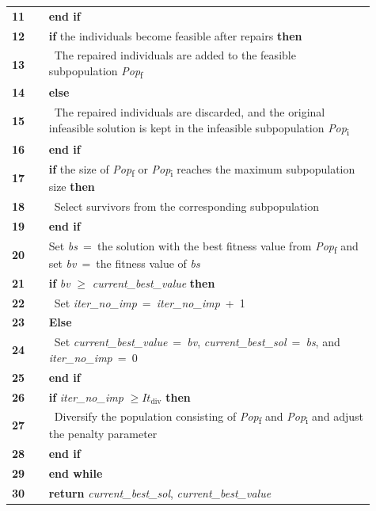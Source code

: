 \begin{longtable}{@{}L{0.055\linewidth}L{0.025\linewidth}L{0.83\linewidth}@{}}
\textbf{11} & & \textbf{end if} \\
\textbf{12} & & \textbf{if} the individuals become feasible after repairs \textbf{then} \\
\textbf{13} & & ~The repaired individuals are added to the feasible subpopulation
\emph{Pop}\textsubscript{f} \\
\textbf{14} & & \textbf{else} \\
\textbf{15} & & ~The repaired individuals are discarded, and the original infeasible solution is
kept in the infeasible subpopulation \emph{Pop}\textsubscript{i} \\
\textbf{16} & & \textbf{end if} \\
\textbf{17} & & \textbf{if} the size of \emph{Pop}\textsubscript{f} or \emph{Pop}\textsubscript{i}
reaches the maximum subpopulation size \textbf{then} \\
\textbf{18} & & ~Select survivors from the corresponding subpopulation \\
\textbf{19} & & \textbf{end if} \\
\textbf{20} & & Set \emph{bs}~=~the solution with the best fitness value from
\emph{Pop}\textsubscript{f} and set \emph{bv}~=~the fitness value of \emph{bs} \\
\textbf{21} & & \textbf{if} \emph{bv} \(\geq\) \emph{current\_best\_value} \textbf{then} \\
\textbf{22} & & ~Set \emph{iter\_no\_imp}~=~\emph{iter\_no\_imp}~+~1 \\
\textbf{23} & & \textbf{Else} \\
\textbf{24} & & ~Set \emph{current\_best\_value}~=~\emph{bv}, \emph{current\_best\_sol}~=~\emph{bs},
and \emph{iter\_no\_imp}~=~0 \\
\textbf{25} & & \textbf{end if} \\
\textbf{26} & & \textbf{if} \emph{iter\_no\_imp} \(\geq It_{\text{div}}\) \textbf{then} \\
\textbf{27} & & ~Diversify the population consisting of \emph{Pop}\textsubscript{f} and
\emph{Pop}\textsubscript{i} and adjust the penalty parameter \\
\textbf{28} & & \textbf{end if} \\
\textbf{29} & & \textbf{end while} \\
\textbf{30} & & \textbf{return} \emph{current\_best\_sol}, \emph{current\_best\_value} \\
\end{longtable}

